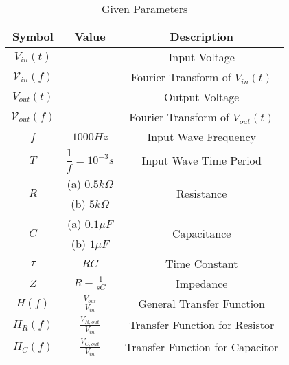 \begin{table}[!h]
    \centering
    \begin{tabular}{|c|c|c|}
    \hline
       \textbf{Symbol}  & \textbf{Value} &  \textbf{Description}\\
    \hline
       $V_{in}(t)$  &  &  Input Voltage\\
    \hline
        $\mathcal{V}_{in}(f)$ & & Fourier Transform of $V_{in}(t)$\\
    \hline
        $V_{out}(t)$ & & Output Voltage\\
    \hline
        $\mathcal{V}_{out}(f)$ & & Fourier Transform of $V_{out}(t)$\\
    \hline
        $f$ & $1000Hz$ & Input Wave Frequency\\
    \hline
        $T$ & $\dfrac{1}{f} = 10^{-3} s$ & Input Wave Time Period\\
    \hline
        \multirow{2}{*}{$R$} & (a) $0.5k\Omega$ & \multirow{2}{*}{Resistance}\\
        \cline{2-2}
        & (b) $5k\Omega$ &\\
        \cline{2-2}
    \hline
        \multirow{2}{*}{$C$} & (a) $0.1\mu F$ & \multirow{2}{*}{Capacitance}\\
        \cline{2-2}
        & (b) $1\mu F$ &\\
        \cline{2-2}
    \hline
        $\tau$ & $RC$ & Time Constant\\
    \hline
        $Z$ & $R + \frac{1}{sC}$ & Impedance\\
    \hline
        $H(f)$ & $\frac{V_{out}}{V_{in}}$ & General Transfer Function\\
    \hline
        $H_{R}(f)$ & $\frac{V_{R, out}}{V_{in}}$ & Transfer Function for Resistor\\
    \hline
        $H_{C}(f)$ & $\frac{V_{C, out}}{V_{in}}$ & Transfer Function for Capacitor\\
    \hline
    \end{tabular}
    \caption{Given Parameters}
    \label{tab:1_gate.23.ph.37}
\end{table}
